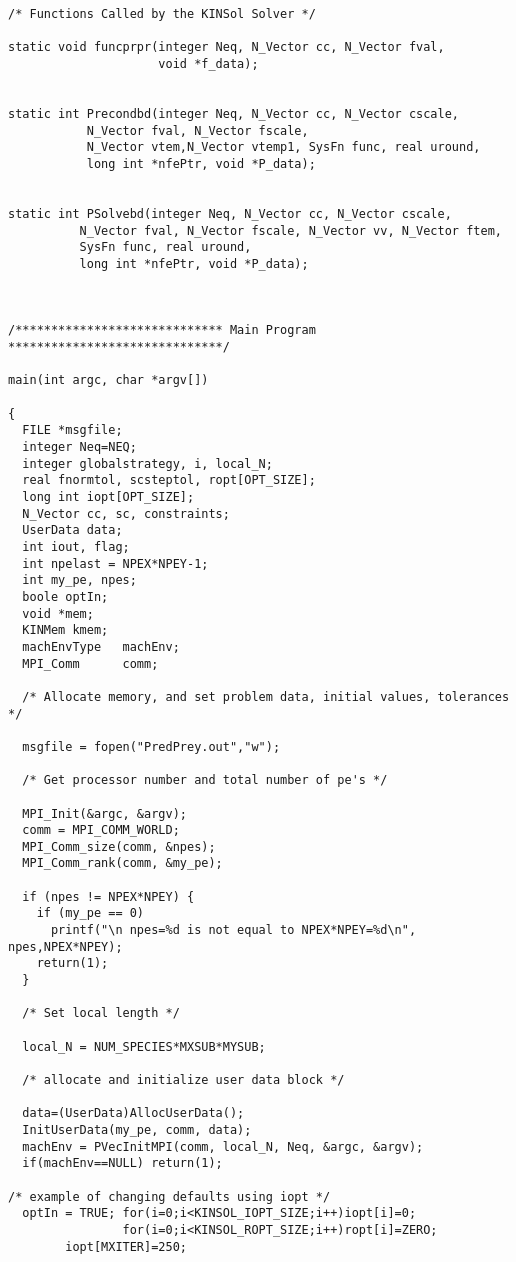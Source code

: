 \documentclass[11pt]{article}
\begin{document}
\begin{verbatim}
/* Functions Called by the KINSol Solver */

static void funcprpr(integer Neq, N_Vector cc, N_Vector fval, 
                     void *f_data);


static int Precondbd(integer Neq, N_Vector cc, N_Vector cscale,
           N_Vector fval, N_Vector fscale,
           N_Vector vtem,N_Vector vtemp1, SysFn func, real uround,
           long int *nfePtr, void *P_data);


static int PSolvebd(integer Neq, N_Vector cc, N_Vector cscale,
          N_Vector fval, N_Vector fscale, N_Vector vv, N_Vector ftem,
          SysFn func, real uround, 
          long int *nfePtr, void *P_data);



/***************************** Main Program ******************************/

main(int argc, char *argv[])

{
  FILE *msgfile;
  integer Neq=NEQ;
  integer globalstrategy, i, local_N;
  real fnormtol, scsteptol, ropt[OPT_SIZE];
  long int iopt[OPT_SIZE];
  N_Vector cc, sc, constraints;
  UserData data;
  int iout, flag;
  int npelast = NPEX*NPEY-1;
  int my_pe, npes;
  boole optIn;
  void *mem;
  KINMem kmem;
  machEnvType   machEnv;
  MPI_Comm      comm;

  /* Allocate memory, and set problem data, initial values, tolerances */ 

  msgfile = fopen("PredPrey.out","w");

  /* Get processor number and total number of pe's */

  MPI_Init(&argc, &argv);
  comm = MPI_COMM_WORLD;
  MPI_Comm_size(comm, &npes);
  MPI_Comm_rank(comm, &my_pe);

  if (npes != NPEX*NPEY) {
    if (my_pe == 0)
      printf("\n npes=%d is not equal to NPEX*NPEY=%d\n", npes,NPEX*NPEY);
    return(1);
  }

  /* Set local length */

  local_N = NUM_SPECIES*MXSUB*MYSUB;

  /* allocate and initialize user data block */

  data=(UserData)AllocUserData();
  InitUserData(my_pe, comm, data);
  machEnv = PVecInitMPI(comm, local_N, Neq, &argc, &argv);
  if(machEnv==NULL) return(1);

/* example of changing defaults using iopt */
  optIn = TRUE; for(i=0;i<KINSOL_IOPT_SIZE;i++)iopt[i]=0; 
                for(i=0;i<KINSOL_ROPT_SIZE;i++)ropt[i]=ZERO;
        iopt[MXITER]=250; 


\end{verbatim}
\end{document}
